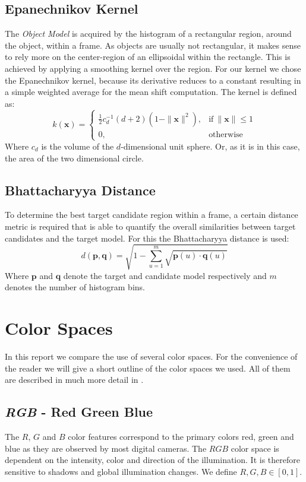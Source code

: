 \documentclass[11pt]{article}
\begin{document}
\subsection{Epanechnikov Kernel}
The \emph{Object Model} is acquired by the histogram of a rectangular region, around
the object, within a frame. As objects are usually not rectangular, it makes sense
to rely more on the center-region of an ellipsoidal within the rectangle. This is
achieved by applying a smoothing kernel over the region. For our kernel we
chose the Epanechnikov kernel, because its derivative reduces to a constant
resulting in a simple weighted average for the mean shift computation. The
kernel is defined as:
\begin{equation}
k(\mathbf{x}) = \left\{
\begin{array}{ll}
\frac{1}{2}c^{-1}_d(d+2)(1-\|\mathbf{x}\|^2), & \textrm{if}~\|\mathbf{x}\| \leq 1 \\
0, & \textrm{otherwise}
\end{array}
\right.
\end{equation}
Where $c_d$ is the volume of the $d$-dimensional unit sphere. Or, as it is in
this case, the area of the two dimensional circle.

\subsection{Bhattacharyya Distance}
To determine the best target candidate region within a frame, a certain
distance metric is required that is able to quantify the overall similarities
between target candidates and the target model. For this the Bhattacharyya
distance is used:
\begin{equation}
d(\mathbf{p},\mathbf{q}) = \sqrt{1 - \sum^m_{u=1} \sqrt{\mathbf{p}(u) \cdot \mathbf{q}(u)}}
\end{equation}
Where $\mathbf{p}$ and $\mathbf{q}$ denote the target and candidate model respectively and $m$
denotes the number of histogram bins.

\section{Color Spaces} \label{sec:color}
In this report we compare the use of several color spaces. For the convenience
of the reader we will give a short outline of the color spaces we used. All of
them are described in much more detail in \cite{Gevers}.

\subsection{\textit{RGB} - Red Green Blue}
The $R$, $G$ and $B$  color features correspond to the primary colors red,
green and blue as they are observed by most digital cameras. The
$RGB$ color space is dependent on the intensity, color and direction of the
illumination. It is therefore sensitive to shadows and global illumination
changes. We define $R, G, B \in [0,1]$.
\end{document}
